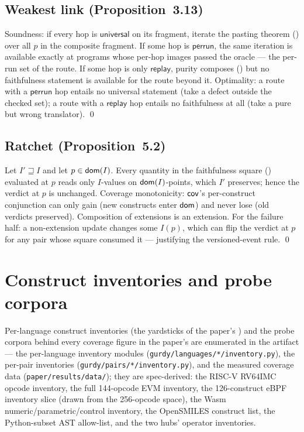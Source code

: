 \subsection{Weakest link (Proposition~3.13)}

Soundness: if every hop is $\mathsf{universal}$ on its fragment, iterate
the pasting theorem () over all $p$ in the composite
fragment. If some hop is
$\mathsf{perrun}$, the same iteration is available exactly at programs
whose per-hop images passed the oracle --- the per-run set of the route.
If some hop is only $\mathsf{replay}$, purity composes
() but no faithfulness statement is available for the
route beyond it. Optimality: a route with a $\mathsf{perrun}$ hop entails
no universal statement (take a defect outside the checked set); a route
with a $\mathsf{replay}$ hop entails no faithfulness at all (take a pure
but wrong translator). \qed

\subsection{Ratchet (Proposition~5.2)}

Let $I' \sqsupseteq I$ and let $p \in \mathsf{dom}(I)$. Every quantity in
the faithfulness square () evaluated at $p$ reads only
$I$-values on
$\mathsf{dom}(I)$-points, which $I'$ preserves; hence the verdict at $p$ is
unchanged. Coverage monotonicity: $\mathsf{cov}$'s per-construct conjunction can
only gain (new constructs enter $\mathsf{dom}$) and never lose (old verdicts
preserved). Composition of extensions is an extension. For the failure
half: a non-extension update changes some $I(p)$, which can flip the
verdict at $p$ for any pair whose square consumed it --- justifying
the versioned-event rule. \qed

\section{Construct inventories and probe corpora}
\label{app:inventories}

Per-language construct inventories (the yardsticks of the paper's
) and the probe corpora behind every coverage figure
in the paper's  are enumerated in the artifact ---
the per-language
inventory modules (\texttt{gurdy/languages/*/inventory.py}), the
per-pair inventories (\texttt{gurdy/pairs/*/inventory.py}), and the
measured coverage data (\texttt{paper/results/data/}); they are
spec-derived: the RISC-V RV64IMC opcode
inventory, the full 144-opcode EVM inventory, the 126-construct eBPF
inventory slice (drawn from the 256-opcode space), the Wasm
numeric/parametric/control inventory, the
OpenSMILES construct list, the Python-subset AST allow-list, and the
two hubs' operator inventories.
